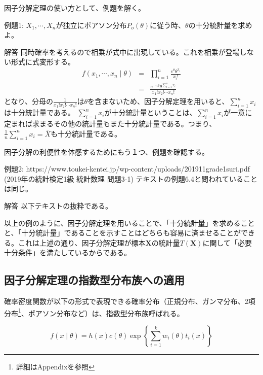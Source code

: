 \documentclass[a4paper,dvipdfmx]{jsarticle}
\begin{document}
\vspace{\baselineskip}
因子分解定理の使い方として、例題を解く。

例題1: $X_1, \cdots , X_n$が独立にポアソン分布$P_o(\theta)$に従う時、$\theta$の十分統計量を求めよ。

\begin{itembox}[c]{解答}
同時確率を考えるので相乗が式中に出現している。これを相乗が登場しない形式に式変形する。
\begin{eqnarray}
f(x_1, \cdots, x_n \mid \theta) &=& \prod_{i=1}^n \frac{e^{\theta}\theta^{x_i}}{x_{i}!} \nonumber\\
&=& \frac{e^{-n\theta}\theta^{\sum_{i=1} ^{n}{x_i}}}{x_{1}!x_{2}!\cdots x_{n}!} \nonumber
\end{eqnarray}
となり、分母の$\frac{1}{x_{1}!x_{2}!\cdots x_{n}!}$は$\theta$を含まないため、因子分解定理を用いると、$\sum_{i=1}^{n}{x_i}$は十分統計量である。
$\sum_{i=1}^{n}{x_i}$が十分統計量ということは、$\sum_{i=1}^{n}{x_i}$が一意に定まれば求まるその他の統計量もまた十分統計量である。つまり、$\frac{1}{n}\sum_{i=1}^{n}{x_i} = \bar{X}$も十分統計量である。
\end{itembox}

\vspace{\baselineskip}
因子分解の利便性を体感するためにもう１つ、例題を確認する。

例題2: https://www.toukei-kentei.jp/wp-content/uploads/201911grade1suri.pdf (2019年の統計検定1級 統計数理 問題3-1) テキストの例題6.4と問われていることは同じ。
\begin{itembox}[c]{解答}
以下テキストの抜粋である。
\end{itembox}


以上の例のように、因子分解定理を用いることで、「十分統計量」を求めることと、「十分統計量」であることを示すことはどちらも容易に済ませることができる。これは上述の通り、因子分解定理が標本$\bm{X}$の統計量$T(\bm{X})$に関して「必要十分条件」を満たしているからである。


\subsection{因子分解定理の指数型分布族への適用}
確率密度関数が以下の形式で表現できる確率分布（正規分布、ガンマ分布、2項分布\footnote{詳細はAppendixを参照}、ポアソン分布など）は、指数型分布族呼ばれる。

\begin{equation}
f(x \mid \theta)= h(x)c(\theta)\exp\left\{\sum_{i=1}^{k} w_i(\theta)t_i(x)\right\} \nonumber
\end{equation}
\end{document}
